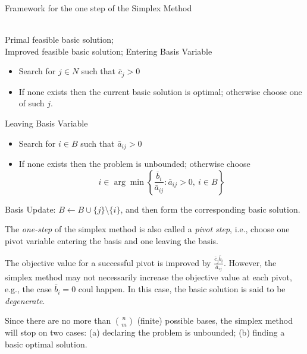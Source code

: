 \begin{algorithm}[htb] 
\caption{Framework for the one step of the Simplex Method} 
\label{alg:SM} 
\begin{algorithmic}[1] %
\REQUIRE ~~\\ %
Primal feasible basic solution;
\ENSURE ~~\\ %
Improved feasible basic solution;
\STATE Entering Basis Variable
\begin{itemize}
\item
Search for $j\in N$ such that $\bar{c}_j>0$
\item
If none exists then the current basic solution is optimal; otherwise choose one of such $j$.
\end{itemize}
\STATE Leaving Basis Variable
\begin{itemize}
\item
Search for $i\in B$ such that $\bar{a}_{ij}>0$
\item
If none exists then the problem is unbounded; otherwise choose
\[
i\in\arg\min\left\{\frac{\bar{b}_i}{\bar{a}_{ij}}: \bar{a}_{ij}>0,\ i\in B
\right\}
\]
\end{itemize}
\label{code:fram:trainbase}
\STATE Basis Update:  $B\leftarrow B\cup\{j\}\setminus\{i\}$, and then form the corresponding basic solution.
\end{algorithmic}
\end{algorithm}
\begin{remark}
The \emph{one-step} of the simplex method is also called a \emph{pivot step}, i.e., choose one pivot variable entering the basis and one leaving the basis.

The objective value for a successful pivot is improved by $\frac{\bar{c}_j\bar{b}_i}{\bar{a}_{ij}}$. However, the simplex method may not necessarily increase the objective value at each pivot, e.g., the case $\bar{b}_i=0$ coul happen. In this case, the basic solution is said to be \emph{degenerate}.

Since there are no more than $\binom{n}{m}$ (finite) possible bases, the simplex method will stop on two cases: (a) declaring the problem is unbounded; (b) finding a basic optimal solution.
\end{remark}
